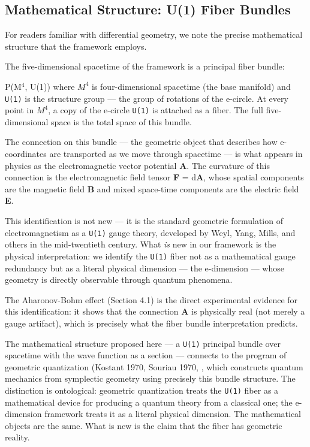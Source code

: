 \documentclass[aps,prd,preprint,superscriptaddress,longbibliography,floatfix]{revtex4-2}
\theoremstyle{remark}
\begin{document}
\subsection{Mathematical Structure: U(1) Fiber Bundles}

For readers familiar with differential geometry, we note the precise mathematical structure that the framework employs.

The five-dimensional spacetime of the framework is a principal fiber bundle:


P(M$^{4}$, U(1))
where $M^{4}$ is four-dimensional spacetime (the base manifold) and \texttt{U(1)} is the structure group --- the group of rotations of the e-circle. At every point in $M^{4}$, a copy of the e-circle \texttt{U(1)} is attached as a fiber. The full five-dimensional space is the total space of this bundle.

The connection on this bundle --- the geometric object that describes how e-coordinates are transported as we move through spacetime --- is what appears in physics as the electromagnetic vector potential \textbf{A}. The curvature of this connection is the electromagnetic field tensor \textbf{F} = d\textbf{A}, whose spatial components are the magnetic field \textbf{B} and mixed space-time components are the electric field \textbf{E}.

This identification is not new --- it is the standard geometric formulation of electromagnetism as a \texttt{U(1)} gauge theory, developed by Weyl, Yang, Mills, and others in the mid-twentieth century. What \textit{is} new in our framework is the physical interpretation: we identify the \texttt{U(1)} fiber not as a mathematical gauge redundancy but as a literal physical dimension --- the e-dimension --- whose geometry is directly observable through quantum phenomena.

The Aharonov-Bohm effect (Section 4.1) is the direct experimental evidence for this identification: it shows that the connection \textbf{A} is physically real (not merely a gauge artifact), which is precisely what the fiber bundle interpretation predicts.

The mathematical structure proposed here --- a \texttt{U(1)} principal bundle over spacetime with the wave function as a section --- connects to the program of geometric quantization (Kostant 1970, Souriau 1970, \cite{Woodhouse1992}, which constructs quantum mechanics from symplectic geometry using precisely this bundle structure. The distinction is ontological: geometric quantization treats the \texttt{U(1)} fiber as a mathematical device for producing a quantum theory from a classical one; the e-dimension framework treats it as a literal physical dimension. The mathematical objects are the same. What is new is the claim that the fiber has geometric reality.
\end{document}

